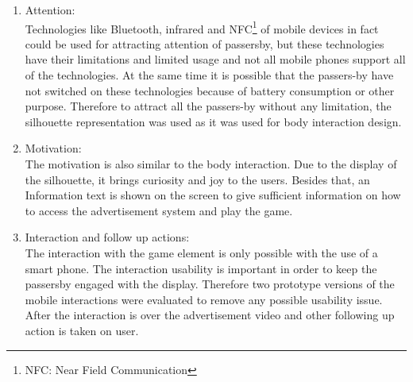 \begin{enumerate}

\item Attention: \\
Technologies like Bluetooth, infrared and NFC\footnote{NFC: Near Field Communication} of mobile devices in fact could be used for attracting attention of passersby, but these technologies have their limitations and limited usage and not all mobile phones support all of the technologies. At the same time it is possible that the passers-by have not switched on these technologies because of battery consumption or other purpose. Therefore to attract all the passers-by without any limitation, the silhouette representation was used as it was used for body interaction design.

\item Motivation: \\
The motivation is also similar to the body interaction. Due to the display of the silhouette, it brings curiosity and joy to the users. Besides that, an Information text is shown on the screen to give sufficient information on how to access the advertisement system and play the game.

\item Interaction and follow up actions: \\
The interaction with the game element is only possible with the use of a smart phone. The interaction usability is important in order to keep the passersby engaged with the display. Therefore two prototype versions of the mobile interactions were evaluated to remove any possible usability issue. After the interaction is over the advertisement video and other following up action is taken on user.


\end{enumerate}















